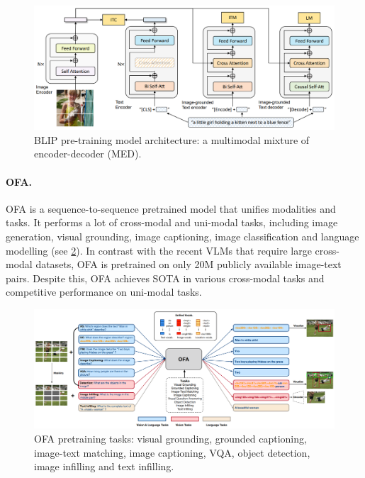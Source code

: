 \begin{figure}[ht]
    \centering
    \includegraphics[width=\linewidth]{images/models/blip.png}
    \caption{BLIP pre-training model architecture: a multimodal mixture
of encoder-decoder (MED).}
    \label{fig:blip}
\end{figure}

\paragraph{OFA.} OFA \cite{wang2022unifying} is a sequence-to-sequence pretrained model that unifies modalities and tasks. It performs a lot of cross-modal and uni-modal tasks, including image generation, visual grounding, image captioning, image classification and language modelling (see \cref{fig:ofa}). In contrast with the recent VLMs that require large cross-modal datasets, OFA is pretrained on only 20M publicly available image-text pairs. Despite this, OFA achieves SOTA in various cross-modal tasks and competitive performance on uni-modal tasks.

\begin{figure}[ht]
    \centering
    \includegraphics[width=\linewidth]{images/models/ofa.png}
    \caption{OFA pretraining tasks: visual grounding, grounded captioning, image-text matching, image captioning, VQA, object detection, image infilling and text infilling.}
    \label{fig:ofa}
\end{figure}

